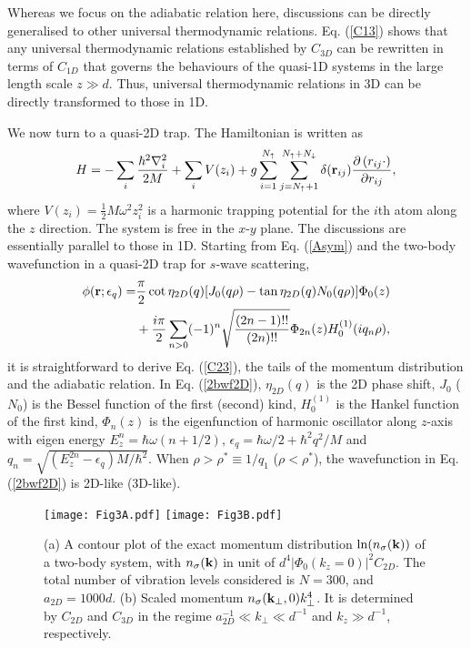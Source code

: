 \documentclass[twocolumn, prl]{revtex4}
\begin{document}
Whereas we focus on the adiabatic relation here, discussions can be directly generalised to other universal thermodynamic relations. Eq. (\ref{C13}) shows that any universal thermodynamic relations established by $C_{3D}$ can be rewritten in terms of $C_{1D}$ that governs the behaviours of the quasi-1D systems in the large length scale $z\gg d$. Thus, universal thermodynamic relations in 3D can be directly transformed to those in 1D.


We now turn to a quasi-2D trap. The Hamiltonian is written as
\begin{equation}
H =  - \sum\limits_i {\frac{{{\hbar ^2}\nabla _i^2}}{{2M}}}  + \sum\limits_i V (z_i) + g\sum\limits_{i = 1}^{{N_ \uparrow }} {\sum\limits_{j = {N_ \uparrow } + 1}^{{N_ \uparrow } + {N_ \downarrow }} {\delta ({{\bf{r}}_{ij}})\frac{{\partial \left( {{r_{ij}} \cdot } \right)}}{{\partial {r_{ij}}}}} } ,
\end{equation}
where $V(z_i)=\frac{1}{2} M \omega^2 z^2_i$ is a harmonic trapping potential for the $i$th atom along the $z$ direction. The system is free in the $x$-$y$ plane. The discussions are essentially parallel to those in 1D. Starting from Eq. (\ref{Asym}) and the two-body wavefunction in a quasi-2D trap for $s$-wave scattering, 
\begin{equation}
\begin{split}
\phi({\bf r};\epsilon_q) = & \frac{\pi}{2} \cot{\eta_{2D}(q) }[J_0(q\rho)-\tan{\eta_{2D}(q)} N_0(q\rho)]\Phi_{0}(z)\\
&+\frac{i\pi}{2} \sum_{n>0}(-1)^n \sqrt{ \frac{(2n-1)!!}{(2n)!!} }\Phi_{2n}(z)H_0^{(1)}(iq_{n}\rho), \label{2bwf2D}
\end{split} 
\end{equation}
it is straightforward to derive Eq. (\ref{C23}), the tails of the momentum distribution and the adiabatic relation. In Eq. (\ref{2bwf2D}), $\eta_{2D}(q)$ is the 2D phase shift, $J_0$ ($N_0$) is the Bessel function of the first (second) kind, $H_0^{(1)}$ is the Hankel function of the first kind, $\Phi_{n}(z)$ is the eigenfunction of harmonic oscillator along $z$-axis with eigen energy $E_z^n=\hbar\omega(n+1/2)$, $\epsilon_q=\hbar \omega/2 +\hbar^2q^2/M$ and $q_n= \sqrt{ (E_z^{2n} -\epsilon_q )M/\hbar^2}$. When $\rho>\rho^*\equiv 1/q_1$ ($\rho<\rho^*$), the wavefunction in Eq. (\ref{2bwf2D}) is 2D-like (3D-like). 


\begin{figure}
	\centering
	{\texttt{[image: Fig3A.pdf]}}
	{\texttt{[image: Fig3B.pdf]}}
	\caption{(a) A contour plot of the exact momentum distribution $\ln(n_\sigma({\bf k}))$ of a two-body system, with $n_\sigma({\bf k})$ in unit of $d^4|\Phi_{0} (k_z=0)|^2 C_{2D}$. The total number of vibration levels considered is $N=300$, and $a_{2D}=1000d$. (b) Scaled momentum $n_\sigma({\bf k}_\bot,0)k_\bot^4$. It is determined by $C_{2D}$ and $C_{3D}$ in the regime $a_{2D}^{-1}\ll k_\bot\ll d^{-1}$ and $k_z\gg d^{-1}$, respectively.  }\label{Fig3}
\end{figure}
\end{document}
